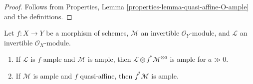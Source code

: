 \begin{proof}
Follows from Properties, Lemma \ref{properties-lemma-quasi-affine-O-ample}
and the definitions.
\end{proof}

\begin{lemma}
\label{lemma-pullback-ample-tensor-relatively-ample}
Let $f : X \to Y$ be a morphism of schemes, $\mathcal{M}$
an invertible $\mathcal{O}_Y$-module, and $\mathcal{L}$ an
invertible $\mathcal{O}_X$-module.
\begin{enumerate}
\item If $\mathcal{L}$ is $f$-ample and $\mathcal{M}$
is ample, then $\mathcal{L} \otimes f^*\mathcal{M}^{\otimes a}$ is ample
for $a \gg 0$.
\item If $\mathcal{M}$ is ample
and $f$ quasi-affine, then $f^*\mathcal{M}$ is ample.
\end{enumerate}
\end{lemma}

